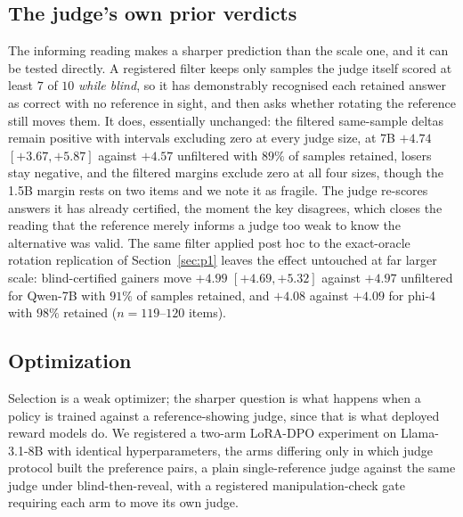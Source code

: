 \documentclass[11pt]{article}
\begin{document}
\subsection{The judge's own prior verdicts}
\label{sec:aw}

The informing reading makes a sharper prediction than the scale one, and it can be tested directly.
A registered filter keeps only samples the judge itself scored at least $7$ of $10$ \emph{while blind}, so it has demonstrably recognised each retained answer as correct with no reference in sight, and then asks whether rotating the reference still moves them.
It does, essentially unchanged: the filtered same-sample deltas remain positive with intervals excluding zero at every judge size, at 7B $+4.74$ $[+3.67, +5.87]$ against $+4.57$ unfiltered with $89\%$ of samples retained, losers stay negative, and the filtered margins exclude zero at all four sizes, though the 1.5B margin rests on two items and we note it as fragile.
The judge re-scores answers it has already certified, the moment the key disagrees, which closes the reading that the reference merely informs a judge too weak to know the alternative was valid.
The same filter applied post hoc to the exact-oracle rotation replication of Section~\ref{sec:p1} leaves the effect untouched at far larger scale: blind-certified gainers move $+4.99$ $[+4.69, +5.32]$ against $+4.97$ unfiltered for Qwen-7B with $91\%$ of samples retained, and $+4.08$ against $+4.09$ for phi-4 with $98\%$ retained ($n{=}119$--$120$ items).

\subsection{Optimization}
\label{sec:dpo}

Selection is a weak optimizer; the sharper question is what happens when a policy is trained against a reference-showing judge, since that is what deployed reward models do.
We registered a two-arm LoRA-DPO experiment on Llama-3.1-8B with identical hyperparameters, the arms differing only in which judge protocol built the preference pairs, a plain single-reference judge against the same judge under blind-then-reveal, with a registered manipulation-check gate requiring each arm to move its own judge.
\end{document}
